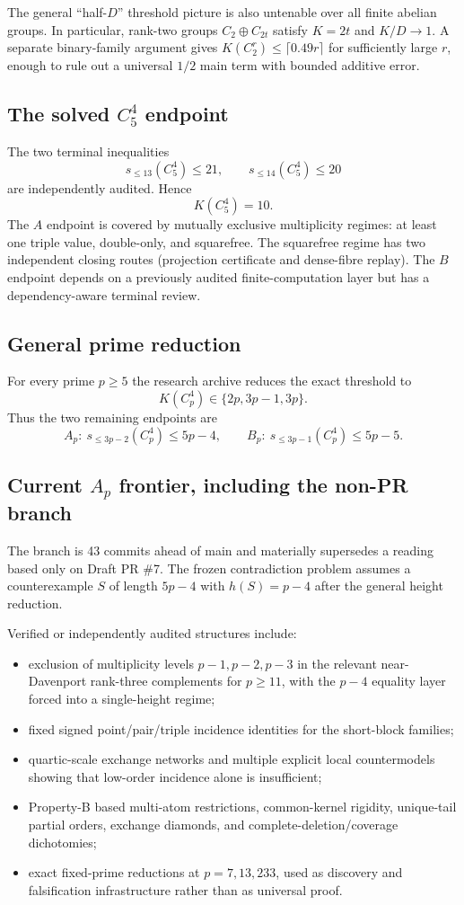 \documentclass[11pt,a4paper]{ctexart}
\begin{document}
The general ``half-$D$'' threshold picture is also untenable over all finite abelian groups. In particular, rank-two groups $C_2\oplus C_{2t}$ satisfy $K=2t$ and $K/D\to1$. A separate binary-family argument gives $K(C_2^r)\le \lceil0.49r\rceil$ for sufficiently large $r$, enough to rule out a universal $1/2$ main term with bounded additive error.

\subsection{The solved $C_5^4$ endpoint}

The two terminal inequalities
\[
s_{\le13}(C_5^4)\le21,
\qquad
s_{\le14}(C_5^4)\le20
\]
are independently audited. Hence
\[
K(C_5^4)=10.
\]
The $A$ endpoint is covered by mutually exclusive multiplicity regimes: at least one triple value, double-only, and squarefree. The squarefree regime has two independent closing routes (projection certificate and dense-fibre replay). The $B$ endpoint depends on a previously audited finite-computation layer but has a dependency-aware terminal review.

\subsection{General prime reduction}

For every prime $p\ge5$ the research archive reduces the exact threshold to
\[
K(C_p^4)\in\{2p,3p-1,3p\}.
\]
Thus the two remaining endpoints are
\[
A_p:\ s_{\le3p-2}(C_p^4)\le5p-4,
\qquad
B_p:\ s_{\le3p-1}(C_p^4)\le5p-5.
\]

\subsection{Current $A_p$ frontier, including the non-PR branch}

The branch  is 43 commits ahead of main and materially supersedes a reading based only on Draft PR \#7. The frozen contradiction problem assumes a counterexample $S$ of length $5p-4$ with $h(S)=p-4$ after the general height reduction.

Verified or independently audited structures include:
\begin{itemize}
\item exclusion of multiplicity levels $p-1,p-2,p-3$ in the relevant near-Davenport rank-three complements for $p\ge11$, with the $p-4$ equality layer forced into a single-height regime;
\item fixed signed point/pair/triple incidence identities for the short-block families;
\item quartic-scale exchange networks and multiple explicit local countermodels showing that low-order incidence alone is insufficient;
\item Property-B based multi-atom restrictions, common-kernel rigidity, unique-tail partial orders, exchange diamonds, and complete-deletion/coverage dichotomies;
\item exact fixed-prime reductions at $p=7,13,233$, used as discovery and falsification infrastructure rather than as universal proof.
\end{itemize}
\end{document}
